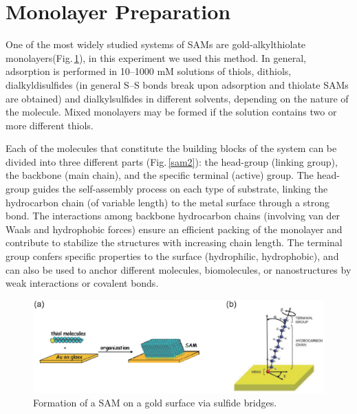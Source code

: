 \section{Monolayer Preparation}

One of the most widely studied systems of SAMs are gold-alkylthiolate monolayers(Fig.\,\ref{sam1}), in this experiment we used this method.
In general, adsorption is performed in 10–1000 mM solutions of thiols, dithiols,
dialkyldisulfides (in general S–S bonds break upon adsorption and thiolate SAMs are obtained) and dialkylsulfides in different solvents, depending on the nature of the molecule. Mixed monolayers may be formed if the solution contains two or more different thiols.

Each of the molecules that constitute the building blocks of the system can be
divided into three different parts (Fig.\,\ref{sam2}):
the head-group (linking group), the backbone (main chain), and the specific terminal (active) group. The head-group guides the self-assembly process on each type of substrate, linking the hydrocarbon chain (of variable length) to the metal surface through a strong bond.
The interactions among backbone hydrocarbon chains (involving van der Waals and hydrophobic forces) ensure an efficient packing of the monolayer and contribute to stabilize the structures with increasing chain length.
The terminal group confers specific properties to the surface (hydrophilic, hydrophobic), and can also be used to anchor different molecules, biomolecules, or nanostructures by weak interactions or covalent bonds.


\begin{figure}[h]
\centering
\includegraphics[width=0.9\columnwidth]{sam.eps}
\caption{Formation of a SAM on a gold surface via sulfide bridges.}
\label{sam1}
\end{figure}


